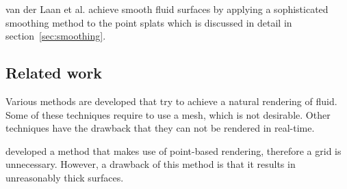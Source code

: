 van der Laan et al. achieve smooth fluid surfaces by applying a sophisticated smoothing method to the point splats which is discussed in detail in section~\ref{sec:smoothing}.

\subsection{Related work}
Various methods are developed that try to achieve a natural rendering of fluid.
Some of these techniques require to use a mesh, which is not desirable.
Other techniques have the drawback that they can not be rendered in real-time.

\cite{zhang2008adaptive} developed a method that makes use of point-based rendering, therefore a grid is unnecessary.
However, a drawback of this method is that it results in unreasonably thick surfaces.
